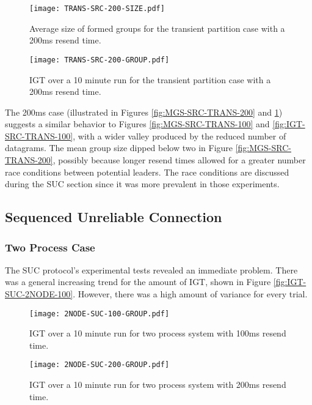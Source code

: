 \begin{figure}
\centering
\begin{minipage}{0.45\textwidth}
    \centering
    \texttt{[image: TRANS-SRC-200-SIZE.pdf]}
    \caption{Average size of formed groups for the transient partition case with a 200ms resend time.}
    \label{fig:MGS-SRC-TRANS-200}
\end{minipage}%
\qquad
\begin{minipage}{0.45\textwidth}
    \centering
    \texttt{[image: TRANS-SRC-200-GROUP.pdf]}
    \caption{\ac{IGT} over a 10 minute run for the transient partition case with a 200ms resend time.}
    \label{fig:IGT-SRC-TRANS-200}
\end{minipage}
\end{figure}

The 200ms case (illustrated in Figures \ref{fig:MGS-SRC-TRANS-200} and \ref{fig:IGT-SRC-TRANS-200}) suggests a similar behavior to Figures \ref{fig:MGS-SRC-TRANS-100} and \ref{fig:IGT-SRC-TRANS-100}, with a wider valley produced by the reduced number of datagrams.
The mean group size dipped below two in Figure \ref{fig:MGS-SRC-TRANS-200}, possibly because longer resend times allowed for a greater number race conditions between potential leaders.
The race conditions are discussed during the SUC section since it was more prevalent in those experiments.

\subsection{Sequenced Unreliable Connection}

\subsubsection{Two Process Case}

The SUC protocol's experimental tests revealed an immediate problem.
There was a general increasing trend for the amount of \ac{IGT}, shown in Figure \ref{fig:IGT-SUC-2NODE-100}.
However, there was a high amount of variance for every trial.

\begin{figure}
\centering
\begin{minipage}{0.45\textwidth}
    \centering
    \texttt{[image: 2NODE-SUC-100-GROUP.pdf]}
    \caption{\ac{IGT} over a 10 minute run for two process system with 100ms resend time.}
    \label{fig:IGT-SUC-2NODE-100}
\end{minipage}%
\qquad
\begin{minipage}{0.45\textwidth}
    \centering
    \texttt{[image: 2NODE-SUC-200-GROUP.pdf]}
    \caption{\ac{IGT} over a 10 minute run for two process system with 200ms resend time.}
    \label{fig:IGT-SUC-2NODE-200}
\end{minipage}
\end{figure}

